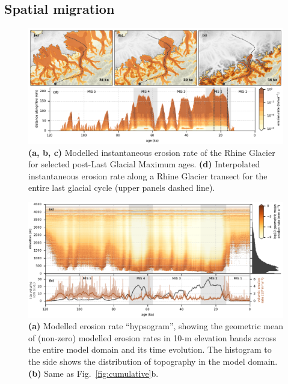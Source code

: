 \documentclass[esurf, manuscript]{copernicus}
\begin{document}
\subsection{Spatial migration}

    \begin{figure}[ht]
      \centerline{\includegraphics{alpero_transects}}
      \caption{%
        \textbf{(a, b, c)} Modelled instantaneous erosion rate of the Rhine
          Glacier for selected post-Last Glacial Maximum ages.
        \textbf{(d)} Interpolated instantaneous erosion rate along a Rhine
          Glacier transect for the entire last glacial cycle (upper panels
          dashed line).}
      \label{fig:transects}
    \end{figure}

    \begin{figure}[ht]
      \centerline{\includegraphics{alpero_hypsogram}}
      \caption{%
        \textbf{(a)} Modelled erosion rate ``hypsogram'', showing the geometric
          mean of (non-zero) modelled erosion rates in 10-m elevation bands
          across the entire model domain and its time evolution. The histogram
          to the side shows the distribution of topography in the model domain.
        \textbf{(b)} Same as Fig.~\ref{fig:cumulative}b.}
      \label{fig:hypsogram}
    \end{figure}
\end{document}
